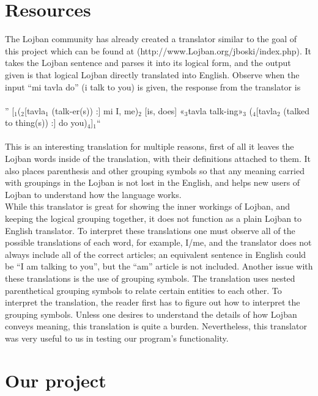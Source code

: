 \documentclass[11pt,letterpaper]{article}
\begin{document}
\section{Resources}

	The Lojban community has already created a translator similar to the goal of this project which can be found at (http://www.Lojban.org/jboski/index.php). It takes the Lojban sentence and parses it into its logical form, and the output given is that logical Lojban directly translated into English. Observe when the input “mi tavla do” (i talk to you) is given, the response from the translator is\\\\” [$_1$($_2$[tavla$_1$ (talk-er(s)) :] mi I, me)$_2$ [is, does] «$_3$tavla talk-ing»$_3$ ($_4$[tavla$_2$ (talked to thing(s)) :] do you)$_4$]$_1 $“\\\\This is an interesting translation for multiple reasons, first of all it leaves the Lojban words inside of the translation, with their definitions attached to them. It also places parenthesis and other grouping symbols so that any meaning carried with groupings in the Lojban is not lost in the English, and helps new users of Lojban to understand how the language works. \\

	While this translator is great for showing the inner workings of Lojban, and keeping the logical grouping together, it does not function as a plain Lojban to English translator. To interpret these translations one must observe all of the possible translations of each word, for example, I/me, and the translator does not always include all of the correct articles; an equivalent sentence in English could be “I am talking to you”, but the “am” article is not included.  Another issue with these translations is the use of grouping symbols.  The translation uses nested parenthetical grouping symbols to relate certain entities to each other. To interpret the translation, the reader first has to figure out how to interpret the grouping symbols. Unless one desires to understand the details of how Lojban conveys meaning, this translation is quite a burden.  Nevertheless, this translator was very useful to us in testing our program’s functionality. \\ 


\section{Our project}
\end{document}
